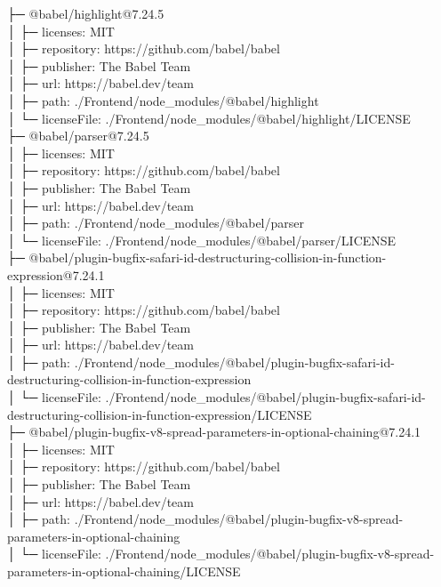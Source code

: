 ├─ @babel/highlight@7.24.5\\
│  ├─ licenses: MIT\\
│  ├─ repository: https://github.com/babel/babel\\
│  ├─ publisher: The Babel Team\\
│  ├─ url: https://babel.dev/team\\
│  ├─ path: ./Frontend/node\_modules/@babel/highlight\\
│  └─ licenseFile: ./Frontend/node\_modules/@babel/highlight/LICENSE\\
├─ @babel/parser@7.24.5\\
│  ├─ licenses: MIT\\
│  ├─ repository: https://github.com/babel/babel\\
│  ├─ publisher: The Babel Team\\
│  ├─ url: https://babel.dev/team\\
│  ├─ path: ./Frontend/node\_modules/@babel/parser\\
│  └─ licenseFile: ./Frontend/node\_modules/@babel/parser/LICENSE\\
├─ @babel/plugin-bugfix-safari-id-destructuring-collision-in-function-expression@7.24.1\\
│  ├─ licenses: MIT\\
│  ├─ repository: https://github.com/babel/babel\\
│  ├─ publisher: The Babel Team\\
│  ├─ url: https://babel.dev/team\\
│  ├─ path: ./Frontend/node\_modules/@babel/plugin-bugfix-safari-id-destructuring-collision-in-function-expression\\
│  └─ licenseFile: ./Frontend/node\_modules/@babel/plugin-bugfix-safari-id-destructuring-collision-in-function-expression/LICENSE\\
├─ @babel/plugin-bugfix-v8-spread-parameters-in-optional-chaining@7.24.1\\
│  ├─ licenses: MIT\\
│  ├─ repository: https://github.com/babel/babel\\
│  ├─ publisher: The Babel Team\\
│  ├─ url: https://babel.dev/team\\
│  ├─ path: ./Frontend/node\_modules/@babel/plugin-bugfix-v8-spread-parameters-in-optional-chaining\\
│  └─ licenseFile: ./Frontend/node\_modules/@babel/plugin-bugfix-v8-spread-parameters-in-optional-chaining/LICENSE\\
